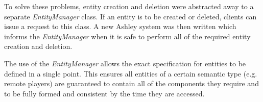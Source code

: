 To solve these problems, entity creation and deletion were abstracted away to a separate \textit{EntityManager} class. If an entity is to be created or deleted, clients can issue a request to this class. A new Ashley system was then written which informs the \textit{EntityManager} when it is safe to perform all of the required entity creation and deletion.

The use of the \textit{EntityManager} allows the exact specification for entities to be defined in a single point. This ensures all entities of a certain semantic type (e.g. remote players) are guaranteed to contain all of the components they require and to be fully formed and consistent by the time they are accessed. 
